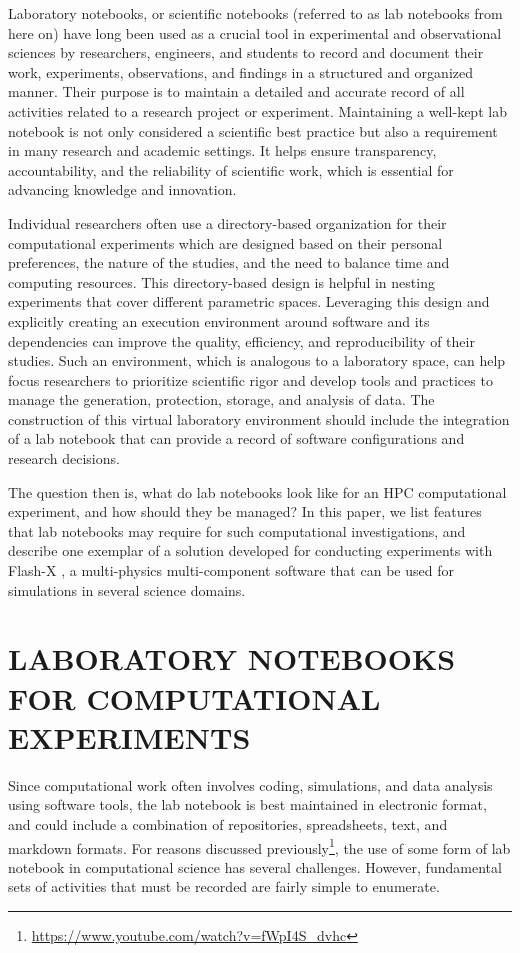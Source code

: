 \documentclass{IEEEcsmag}
\begin{document}
Laboratory notebooks, or scientific notebooks (referred to as lab notebooks from here on) have long been used as a crucial tool in experimental and observational sciences by researchers, engineers, and students to record and document their work, experiments, observations, and findings in a structured and organized manner. Their purpose is to maintain a
detailed and accurate record of all activities related to a research project or experiment. Maintaining a well-kept lab notebook is not only considered a scientific best practice but also a requirement in
many research and academic settings. It helps ensure transparency, accountability, and the reliability of scientific work, which is
essential for advancing knowledge and innovation.

Individual researchers often use a directory-based organization for their computational experiments which are designed based on their personal preferences, the nature of the studies, and the need to balance time and computing resources. This directory-based design is helpful in nesting experiments that cover different parametric spaces. Leveraging this design and explicitly creating an execution environment around software and its dependencies can improve the quality, efficiency, and reproducibility of their studies. Such an environment, which is analogous to a laboratory space, can help focus researchers to prioritize scientific rigor and develop tools and practices to manage the generation, protection, storage, and analysis of data. The construction of this virtual laboratory environment should include the integration of a lab notebook that can provide a record of software configurations and research decisions.
 
 
 The question then is, what do lab notebooks look like for an HPC computational experiment, and how should they be managed? In this paper, we list features that lab notebooks may require for such computational investigations, and describe one exemplar of a  solution developed for conducting experiments with Flash-X \cite{DUBEY2022101168}, a multi-physics multi-component software that can be used for simulations in several science domains.

\section{LABORATORY NOTEBOOKS FOR COMPUTATIONAL EXPERIMENTS}
Since computational work often involves coding, simulations, and data
analysis using software tools, the lab notebook is best maintained in
electronic format, and could include a combination of repositories,
spreadsheets, text, and markdown formats. 
For reasons discussed previously\footnote{\url{https://www.youtube.com/watch?v=fWpI4S_dvhc}}, the use of some form of
lab notebook in computational science has several challenges.
However, fundamental sets of activities that must be recorded are fairly
simple to enumerate. 
\end{document}
